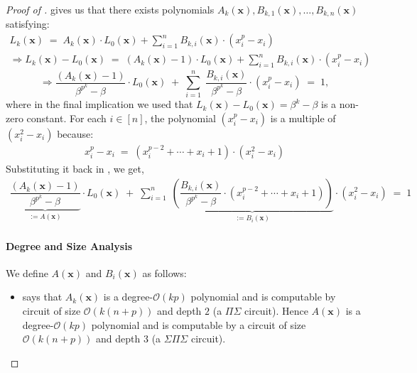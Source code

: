 \documentclass[11pt]{article}
\newcommand{\bigO}{\mathcal{O}}
\newcommand{\paren}[1]{\left( #1 \right)}
\begin{document}
\begin{proof}[Proof of ]
\noindent
{} gives us that there exists polynomials $A_{k}(\mathbf{x}), B_{k,1}(\mathbf{x}), \ldots, B_{k,n}(\mathbf{x})$ satisfying:
\begin{align*}
    L_{k}(\mathbf{x}) \; = \; A_{k}(\mathbf{x}) \cdot L_{0}(\mathbf{x}) + \sum_{i=1}^{n} B_{k,i}(\mathbf{x}) \cdot (x_{i}^{p} - x_{i}) \\
    \Rightarrow L_{k}(\mathbf{x}) - L_{0}(\mathbf{x}) \; = \; (A_{k}(\mathbf{x}) - 1) \cdot L_{0}(\mathbf{x}) + \sum_{i = 1}^{n} B_{k,i}(\mathbf{x}) \cdot (x_{i}^{p} - x_{i})
\end{align*}
\begin{equation}\label{eqn:ubd-non-ml-final-linear}
    \Rightarrow \dfrac{(A_{k}(\mathbf{x}) - 1)}{\beta^{p^{k}} - \beta} \cdot L_{0}(\mathbf{x}) \; + \; \sum_{i = 1}^{n} \; \dfrac{B_{k,i}(\mathbf{x})}{\beta^{p^{k}} - \beta} \cdot (x_{i}^{p} - x_{i}) \; = \; 1,
\end{equation}
where in the final implication we used that $L_{k}(\mathbf{x}) - L_{0}(\mathbf{x}) = \beta^{k} - \beta$ is a non-zero constant. For each $i \in [n]$, the polynomial $(x_{i}^{p} - x_{i})$ is a multiple of $(x_{i}^{2} - x_{i})$ because:
\begin{align*}
    x_{i}^{p} - x_{i} \; = \; (x_{i}^{p-2} + \cdots + x_{i} + 1) \cdot (x_{i}^{2} - x_{i})
\end{align*}
Substituting it back in , we get,
\begin{align*}
    \underbrace{\dfrac{(A_{k}(\mathbf{x}) - 1)}{\beta^{p^{k}} - \beta}}_{:= A(\mathbf{x})} \cdot L_{0}(\mathbf{x}) \; + \; \sum_{i = 1}^{n} \; \underbrace{\paren{\dfrac{B_{k,i}(\mathbf{x})}{\beta^{p^{k}} - \beta} \cdot (x_{i}^{p-2} + \cdots + x_{i} + 1) }}_{:= B_{i}(\mathbf{x})} \cdot (x_{i}^{2} - x_{i}) \; = \; 1
\end{align*}

\paragraph{Degree and Size Analysis}We define $A(\mathbf{x})$ and $B_{i}(\mathbf{x})$ as follows:
\begin{itemize}
    \item {} says that $A_{k}(\mathbf{x})$ is a degree-$\bigO(kp)$ polynomial and is computable by circuit of size $\bigO(k  (n+p))$ and depth $2$ (a $\Pi \Sigma$ circuit). Hence $A(\mathbf{x})$ is a degree-$\bigO(k p)$ polynomial and is computable by a circuit of size $\bigO(k (n+p))$ and depth $3$ (a $\Sigma \Pi \Sigma$ circuit).
    

\end{itemize}
\end{proof}
\end{document}
